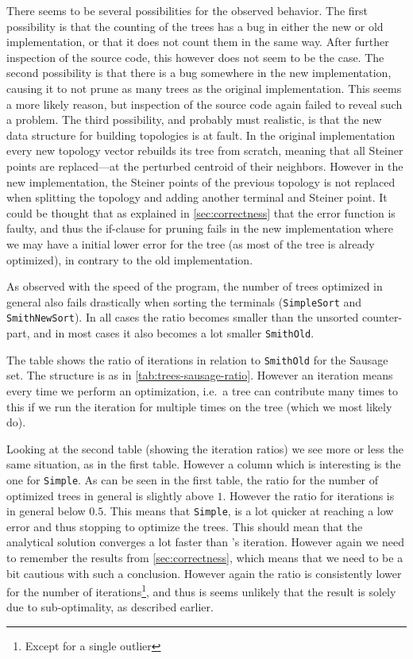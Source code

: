 There seems to be several possibilities for the observed behavior. The first
possibility is that the counting of the trees has a bug in either the new or old
implementation, or that it does not count them in the same way. After further
inspection of the source code, this however does not seem to be the case. The
second possibility is that there is a bug somewhere in the new implementation,
causing it to not prune as many trees as the original implementation. This seems
a more likely reason, but inspection of the source code again failed to reveal
such a problem. The third possibility, and probably must realistic, is that the
new data structure for building topologies is at fault. In the original
implementation every new topology vector rebuilds its tree from scratch, meaning
that all Steiner points are replaced---at the perturbed centroid of their
neighbors. However in the new implementation, the Steiner points of the previous
topology is not replaced when splitting the topology and adding another terminal
and Steiner point. It could be thought that as explained in
\cref{sec:correctness} that the error function is faulty, and thus the if-clause
for pruning fails in the new implementation where we may have a initial lower
error for the tree (as most of the tree is already optimized), in contrary to
the old implementation.

As observed with the speed of the program, the number of trees optimized in
general also fails drastically when sorting the terminals (\texttt{SimpleSort}
and \texttt{SmithNewSort}). In all cases the ratio becomes smaller than the
unsorted counter-part, and in most cases it also becomes a lot smaller
\texttt{SmithOld}.

\begin{table}[htbp]
  \centering
  
  \caption[Iteration ratio for Sausage]{The table shows the ratio of iterations
    in relation to \texttt{SmithOld} for the Sausage set. The structure is as
    in \cref{tab:trees-sausage-ratio}. However an iteration means every time we
    perform an optimization, i.e.\ a tree can contribute many times to this if
    we run the iteration for multiple times on the tree (which we most likely
    do).\label{tab:iterations-sausage-ratio}}
\end{table}

Looking at the second table (showing the iteration ratios) we see more or less
the same situation, as in the first table. However a column which is interesting
is the one for \texttt{Simple}. As can be seen in the first table, the ratio for
the number of optimized trees in general is slightly above $1$. However the
ratio for iterations is in general below $0.5$. This means that \texttt{Simple},
is a lot quicker at reaching a low error and thus stopping to optimize the
trees. This should mean that the analytical solution converges a lot faster than
\autocite{smith1992}'s iteration. However again we need to remember the results
from \cref{sec:correctness}, which means that we need to be a bit cautious with
such a conclusion. However again the ratio is consistently lower for the number
of iterations\footnote{Except for a single outlier}, and thus is seems unlikely
that the result is solely due to sub-optimality, as described earlier.

